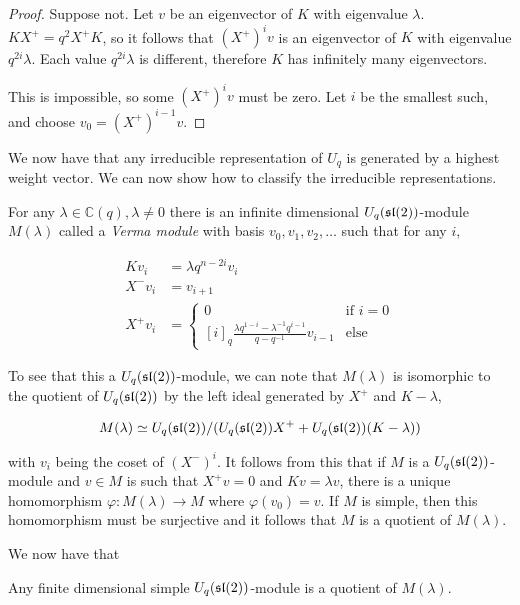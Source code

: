 \begin{proof}

    Suppose not. Let $v$ be an eigenvector of $K$ with eigenvalue $\lambda$.
    $K X^+ = q^2  X^+ K$, so it follows that $(X^+)^i v$ is an
    eigenvector of $K$ with eigenvalue $q^{2i}\lambda$. Each value
    $q^{2i}\lambda$ is different, therefore $K$ has infinitely many
    eigenvectors. 

    This is impossible, so some $(X^+)^i v$ must be zero. Let $i$ be the
    smallest such, and choose $v_0 = (X^+)^{i-1} v$.
\end{proof}

We now have that any irreducible representation of $U_q$ is generated by a
highest weight vector. We can now show how to classify the irreducible
representations. 

For any $\lambda \in \mathbb{C}(q), \lambda \neq 0$ there is an infinite
dimensional $U_q(\mathfrak{sl}(2))$-module $M(\lambda)$ called a \emph{Verma module}
with basis $v_0, v_1, v_2, \ldots$ such that for any $i$,

\begin{align}
    Kv_i &= \lambda q^{n-2i}v_i \\
    X^-v_i &= v_{i+1} \\
     X^+ v_i &= \begin{cases} 0 & \text{if $i = 0$} \\
                          [i]_q \frac{\lambda q^{1-i} - \lambda^{-1}q^{i-1}}{q - q^{-1}}v_{i-1} & \text{else}
            \end{cases}
\end{align}

To see that this a $U_q(\mathfrak{sl}(2))$-module, we can note that $M(\lambda)$ is isomorphic to the quotient of $U_q(\mathfrak{sl}(2))$ by the left ideal generated by $X^+$ and $K-\lambda$,

\begin{equation}
    M(\lambda) \simeq U_q(\mathfrak{sl}(2))/(U_q(\mathfrak{sl}(2)) X^+  + U_q(\mathfrak{sl}(2))(K-\lambda))
\end{equation}

with $v_i$ being the coset of $(X^-)^i$. It follows from this that if $M$ is a
$U_q(\mathfrak{sl}(2))$-module and $v \in M$ is such that $X^+ v = 0$ and $Kv = \lambda v$, there
is a unique homomorphism $\varphi: M(\lambda) \to M$ where $\varphi(v_0) = v$.
If $M$ is simple, then this homomorphism must be  surjective and it follows
that $M$ is a quotient of $M(\lambda)$. 

We now have that 
\begin{claim}
    Any finite dimensional simple $U_q(\mathfrak{sl}(2))$-module is a quotient of $M(\lambda)$.
\end{claim}

